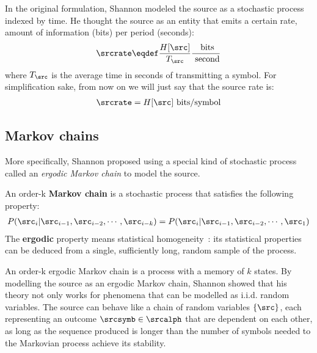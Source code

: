In the original formulation, Shannon modeled the source as a stochastic process indexed by time. He thought the source as an entity that emits a certain rate, amount of information (bits) per period (seconds):
\begin{align}
\srcrate \eqdef \frac{H[\src]}{T_{\src}} \frac{\text{ bits}}{\text{ second}}
\end{align}
where \(T_{\src}\) is the average time in seconds of transmitting a symbol.
For simplification sake, from now on we will just say that the source rate is:
\begin{align}
	\srcrate = H[\src] \text{ bits/symbol}
	\end{align}

\subsection{Markov chains} More specifically, Shannon proposed using a special kind of stochastic process called an \emph{ergodic Markov chain} to model the source.
\begin{definition}
	An order-k \textbf{Markov chain} is a stochastic process that satisfies the following property:
	\begin{align}
		P(\src_i|\src_{i-1}, \src_{i-2}, \cdots, \src_{i-k})=P(\src_i|\src_{i-1}, \src_{i-2}, \cdots, \src_1)
	\end{align}
	The \textbf{ergodic} property means statistical homogeneity~\cite{shannon:1949}: its statistical properties can be deduced from a single, sufficiently long, random sample of the process.

\end{definition}
An order-k ergodic Markov chain is a process with a memory of \(k\) states. By modelling the source as an ergodic Markov chain, Shannon showed that his theory not only works for phenomena that can be modelled as i.i.d. random variables. The source can behave like a chain of random variables \( \{\src\}\), each representing an outcome \(\srcsymb \in \srcalph\) that are dependent on each other, as long as the sequence produced is longer than the number of symbols needed to the Markovian process achieve its stability.


